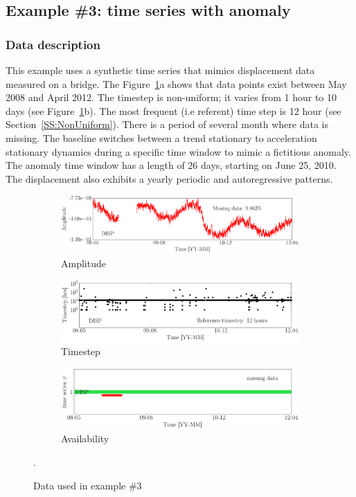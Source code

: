 \subsection{Example \#3: time series with anomaly}
\label{S:ExampleDispAnomaly}


\subsubsection{Data description}
This example uses a synthetic time series that mimics displacement data measured on a bridge. 
The Figure~\ref{fig:DataSummaryRaw3}a shows that data points exist between May 2008 and April 2012.
The timestep is non-uniform; it varies from 1 hour to 10 days (see Figure~\ref{fig:DataSummaryRaw3}b). 
The most frequent (i.e referent) time step is 12 hour (see Section~\ref{SS:NonUniform}).
There is a period of several month where data is missing.
The baseline switches between a trend stationary to acceleration stationary dynamics during a specific time window to mimic a fictitious anomaly.
The anomaly time window has a length of 26 days, starting on June 25, 2010.
The displacement also exhibits a yearly periodic and autoregressive patterns.

\begin{figure}[h!]
\centering
\begin{subfigure}{\linewidth}
\includegraphics[width=0.95\linewidth]{./docfigs/Example_DISPSIM_ANOMALY/raw/ALL_AMPLITUDES.pdf} 
\caption{Amplitude}
\end{subfigure}
\begin{subfigure}{\linewidth}\centering
\includegraphics[width=0.9\linewidth]{./docfigs/Example_DISPSIM_ANOMALY/raw/ALL_TIMESTEPS.pdf}
\caption{Timestep}
\end{subfigure}
\begin{subfigure}{\linewidth}\centering
\includegraphics[width=0.9\linewidth]{./docfigs/Example_DISPSIM_ANOMALY/raw/AVAILABILITY.pdf}
\caption{Availability}
\end{subfigure}
\caption{Data used in example \#3}.
\label{fig:DataSummaryRaw3}
\end{figure}




